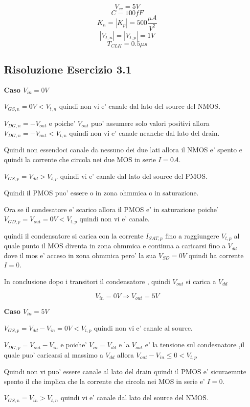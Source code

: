 \documentclass[\main/main.tex]{subfiles}
\begin{document}
\[V_{cc}= 5V\]
\[C = 100fF\]
\[K_n = |K_p| = 500 \frac{\mu A}{V^2}\]
\[|V_{t,n}| = |V_{t,p}| = 1V\]
\[T_{CLK} = 0.5\mu s\]

\clearpage
\subsection{Risoluzione Esercizio 3.1}

\textbf{Caso $V_{in} = 0V$}

$V_{GS,n} = 0V < V_{t,n}$ quindi non vi e' canale dal lato del source del NMOS.

$V_{DG,n} = -V_{out} $ e poiche' $V_{out}$ puo' assumere solo valori positivi allora $V_{DG,n} = -V_{out} < V_{t,n}$ quindi non vi e' canale neanche dal lato del drain.

Quindi non essendoci canale da nessuno dei due lati allora il NMOS e' spento e quindi la corrente che circola nei due MOS in serie $I = 0A$.


$V_{GS,p} = V_{dd} > V_{t,p}$ quindi vi e' canale dal lato del source del PMOS.

Quindi il PMOS puo' essere o in zona ohmmica o in saturazione.

Ora se il condesatore e' scarico allora il PMOS e' in saturazione poiche' $V_{GD,p} = V_{out} = 0V < V_{t,p}$ quindi non vi e' canale.

quindi il condensatore si carica con la corrente $I_{SAT,p}$ fino a raggiungere $V_{t,p}$ al quale punto il MOS diventa in zona ohmmica
e continua a caricarsi fino a $V_{dd}$ dove il mos e' acceso in zona ohmmica pero' la sua $V_{SD} = 0V$ quindi ha corrente $I = 0$.

In conclusione dopo i transitori il condensatore , quindi $V_{out}$ si carica a $V_{dd}$

\[V_{in} = 0V \Rightarrow V_{out} = 5V\]



\textbf{Caso $V_{in} = 5V$}

$V_{GS,p} = V_{dd} - V_{in} = 0V < V_{t,p}$ quindi non vi e' canale al source.

$V_{DG,p} = V_{out} - V_{in}$ e poiche' $V_{in} = V_{dd}$ e la $V_{out}$ e' la tensione sul condesnatore ,il quale puo' caricarsi al massimo a $V_{dd}$ allora $V_{out} - V_{in} \le 0 < V_{t,p}$

Quindi non vi puo' essere canale al lato del drain  quindi il PMOS e' sicuraemnte spento il che implica che la corrente che circola nei MOS in serie e' $I = 0$.

$V_{GS,n} = V_{in} > V_{t,n}$ quindi vi e' canale dal lato del source del NMOS.
\end{document}
